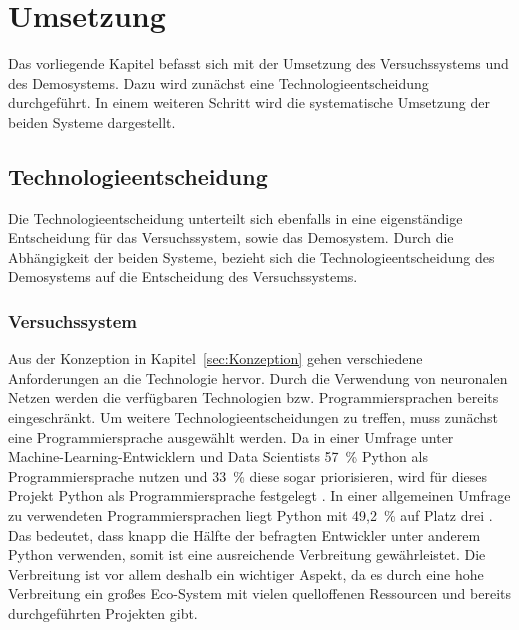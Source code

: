 \section{Umsetzung}

\textauthor{\vJB,}{\vLB,}{\vHS}

Das vorliegende Kapitel befasst sich mit der Umsetzung des Versuchssystems und des Demosystems.
Dazu wird zunächst eine Technologieentscheidung durchgeführt.
In einem weiteren Schritt wird die systematische Umsetzung der beiden Systeme dargestellt.

\subsection{Technologieentscheidung}

\textauthor{\vJB,}{\vLB,}{\vHS}

Die Technologieentscheidung unterteilt sich ebenfalls in eine eigenständige Entscheidung für das Versuchssystem, sowie das Demosystem.
Durch die Abhängigkeit der beiden Systeme, bezieht sich die Technologieentscheidung des Demosystems auf die Entscheidung des Versuchssystems.

\subsubsection{Versuchssystem}\label{sec:TechnologieVersuchssystem}

\textauthor{\vJB,}{\vLB}{}

Aus der Konzeption in Kapitel~\ref{sec:Konzeption} gehen verschiedene Anforderungen an die Technologie hervor.
Durch die Verwendung von neuronalen Netzen werden die verfügbaren Technologien bzw. Programmiersprachen bereits eingeschränkt.
Um weitere Technologieentscheidungen zu treffen, muss zunächst eine Programmiersprache ausgewählt werden.
Da in einer Umfrage unter Machine-Learning-Entwicklern und Data Scientists 57~\% Python als Programmiersprache nutzen und 33~\% diese sogar priorisieren, wird für dieses Projekt Python als Programmiersprache festgelegt \autocite[vgl. ][S. 16]{vision_mobile_state_2017}.
In einer allgemeinen Umfrage zu verwendeten Programmiersprachen liegt Python mit 49,2~\% auf Platz drei \autocite[vgl.][]{yepis_2023_2023}.
Das bedeutet, dass knapp die Hälfte der befragten Entwickler unter anderem Python verwenden, somit ist eine ausreichende Verbreitung gewährleistet.
Die Verbreitung ist vor allem deshalb ein wichtiger Aspekt, da es durch eine hohe Verbreitung ein großes Eco-System mit vielen quelloffenen Ressourcen und bereits durchgeführten Projekten gibt.

